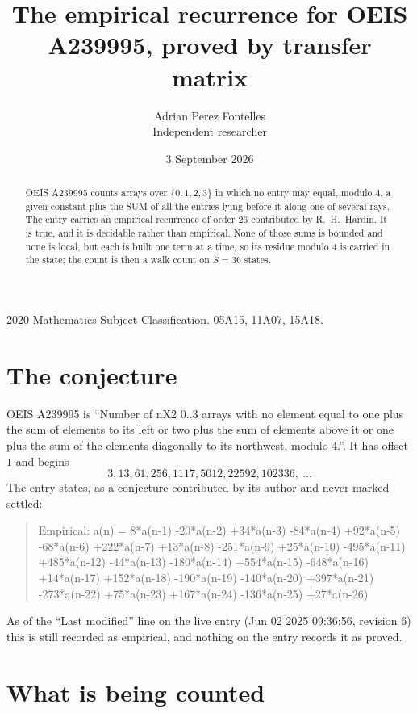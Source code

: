 \documentclass[11pt,a4paper]{article}
\title{The empirical recurrence for OEIS A239995, proved by transfer matrix}
\author{Adrian Perez Fontelles\\ \small Independent researcher}
\date{3 September 2026}
\theoremstyle{plain}
\theoremstyle{definition}
\begin{document}
\maketitle

\begin{abstract}
OEIS A239995 counts arrays over $\{0,1,2,3\}$ in which no entry may equal, modulo $4$, a given
constant plus the SUM of all the entries lying before it along one of several rays. The entry
carries an empirical recurrence of order $26$ contributed by R.~H.~Hardin. It is true, and
it is decidable rather than empirical. None of those sums is bounded and none is local, but
each is built one term at a time, so its residue modulo $4$ is carried in the state; the
count is then a walk count on $S=36$ states.
\end{abstract}

\noindent\small 2020 Mathematics Subject Classification. 05A15, 11A07, 15A18.\normalsize

\section{The conjecture}

OEIS A239995 is ``Number of nX2 0..3 arrays with no element equal to one plus the sum of elements to its left or two plus the sum of elements above it or one plus the sum of the elements diagonally to its northwest, modulo 4.''. It has offset $1$ and begins
\[
3, 13, 61, 256, 1117, 5012, 22592, 102336,\ \dots
\]
The entry states, as a conjecture contributed by its author and never marked settled:
\begin{quote}
Empirical: a(n) = 8*a(n-1) -20*a(n-2) +34*a(n-3) -84*a(n-4) +92*a(n-5) -68*a(n-6) +222*a(n-7) +13*a(n-8) -251*a(n-9) +25*a(n-10) -495*a(n-11) +485*a(n-12) -44*a(n-13) -180*a(n-14) +554*a(n-15) -648*a(n-16) +14*a(n-17) +152*a(n-18) -190*a(n-19) -140*a(n-20) +397*a(n-21) -273*a(n-22) +75*a(n-23) +167*a(n-24) -136*a(n-25) +27*a(n-26)
\end{quote}
As of the ``Last modified'' line on the live entry (Jun 02 2025 09:36:56, revision 6) this is still
recorded as empirical, and nothing on the entry records it as proved.

\section{What is being counted}
\end{document}
